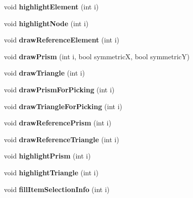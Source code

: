 \begin{DoxyCompactItemize}
\item 
\hypertarget{classGLWidget_ada0503af64f483c91e342ba5c3dcef49}{}void {\bfseries highlight\+Element} (int i)\label{classGLWidget_ada0503af64f483c91e342ba5c3dcef49}

\item 
\hypertarget{classGLWidget_addb75eed990f0b943d47009f14e8a3de}{}void {\bfseries highlight\+Node} (int i)\label{classGLWidget_addb75eed990f0b943d47009f14e8a3de}

\item 
\hypertarget{classGLWidget_a7be96b028f099e61dfbc75254316c078}{}void {\bfseries draw\+Reference\+Element} (int i)\label{classGLWidget_a7be96b028f099e61dfbc75254316c078}

\item 
\hypertarget{classGLWidget_a523f68e2bf91f762bbd4fb5ab734e737}{}void {\bfseries draw\+Prism} (int i, bool symmetric\+X, bool symmetric\+Y)\label{classGLWidget_a523f68e2bf91f762bbd4fb5ab734e737}

\item 
\hypertarget{classGLWidget_a61c80b66b9686c4325dec480f6d3eef9}{}void {\bfseries draw\+Triangle} (int i)\label{classGLWidget_a61c80b66b9686c4325dec480f6d3eef9}

\item 
\hypertarget{classGLWidget_a36c00f9f2aec8eff1291efd1416be16e}{}void {\bfseries draw\+Prism\+For\+Picking} (int i)\label{classGLWidget_a36c00f9f2aec8eff1291efd1416be16e}

\item 
\hypertarget{classGLWidget_a1b670bed499c7bb756cae4b7b2153426}{}void {\bfseries draw\+Triangle\+For\+Picking} (int i)\label{classGLWidget_a1b670bed499c7bb756cae4b7b2153426}

\item 
\hypertarget{classGLWidget_aae1cc6d1837d0d0bb454eb0dda4b5a7c}{}void {\bfseries draw\+Reference\+Prism} (int i)\label{classGLWidget_aae1cc6d1837d0d0bb454eb0dda4b5a7c}

\item 
\hypertarget{classGLWidget_a80bd480b4e4828e7cc6e043805f804ac}{}void {\bfseries draw\+Reference\+Triangle} (int i)\label{classGLWidget_a80bd480b4e4828e7cc6e043805f804ac}

\item 
\hypertarget{classGLWidget_a3486092418bb1d3050860c7b4539fef1}{}void {\bfseries highlight\+Prism} (int i)\label{classGLWidget_a3486092418bb1d3050860c7b4539fef1}

\item 
\hypertarget{classGLWidget_aa3bfac7b767b04f2dd0685692b4f5aa2}{}void {\bfseries highlight\+Triangle} (int i)\label{classGLWidget_aa3bfac7b767b04f2dd0685692b4f5aa2}

\item 
\hypertarget{classGLWidget_af2ce64f5342b0a42f9460a9173b7eaf7}{}void {\bfseries fill\+Item\+Selection\+Info} (int i)\label{classGLWidget_af2ce64f5342b0a42f9460a9173b7eaf7}

\end{DoxyCompactItemize}


